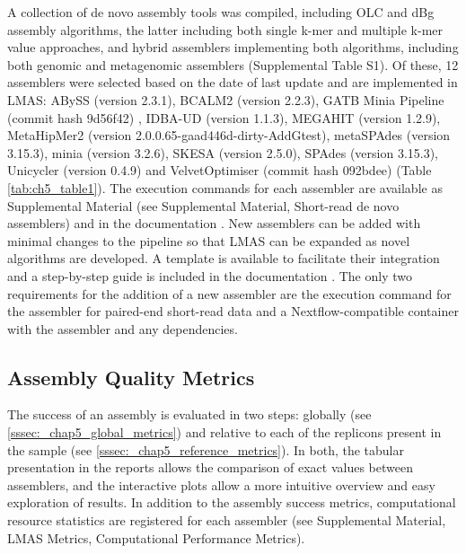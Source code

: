 A collection of de novo assembly tools was compiled, including \ac{OLC} and \ac{dBg} assembly algorithms, the latter including both single k-mer and multiple k-mer value approaches, and hybrid assemblers implementing both algorithms, including both genomic and metagenomic assemblers (Supplemental Table S1). Of these, 12 assemblers were selected based on the date of last update and are implemented in LMAS: ABySS \cite{jackman_abyss_2017} (version 2.3.1), BCALM2 \cite{chikhi_compacting_2016} (version 2.2.3), GATB Minia Pipeline \cite{noauthor_gatbgatb-minia-pipeline_2022} (commit hash 9d56f42) , IDBA-UD \cite{peng_idba-ud_2012} (version 1.1.3), MEGAHIT \cite{li_megahit_2015} (version 1.2.9), MetaHipMer2 \cite{georganas_extreme_2018} (version 2.0.0.65-gaad446d-dirty-AddGtest), metaSPAdes \cite{nurk_metaspades_2017} (version 3.15.3), minia \cite{chikhi_space-efficient_2013} (version 3.2.6), SKESA \cite{souvorov_skesa_2018} (version 2.5.0), SPAdes \cite{bankevich_spades_2012} (version 3.15.3), Unicycler \cite{wick_unicycler_2017} (version 0.4.9) and VelvetOptimiser \cite{seemann_velvetoptimiser_2021} (commit hash 092bdee) (Table \ref{tab:ch5_table1}). The execution commands for each assembler are available as Supplemental Material (see Supplemental Material, Short-read de novo assemblers) and in the documentation \cite{noauthor_short-read_nodate}. 
New assemblers can be added with minimal changes to the pipeline so that LMAS can be expanded as novel algorithms are developed. A template is available to facilitate their integration and a step-by-step guide is included in the documentation \cite{noauthor_add_nodate}. The only two requirements for the addition of a new assembler are the execution command for the assembler for paired-end short-read data and a Nextflow-compatible container with the assembler and any dependencies.



\subsection{Assembly Quality Metrics}

The success of an assembly is evaluated in two steps: globally (see \ref{sssec:_chap5_global_metrics}) and relative to each of the replicons present in the sample (see \ref{sssec:_chap5_reference_metrics}). In both, the tabular presentation in the reports allows the comparison of exact values between assemblers, and the interactive plots allow a more intuitive overview and easy exploration of results. In addition to the assembly success metrics, computational resource statistics are registered for each assembler (see Supplemental Material, LMAS Metrics, Computational Performance Metrics).

